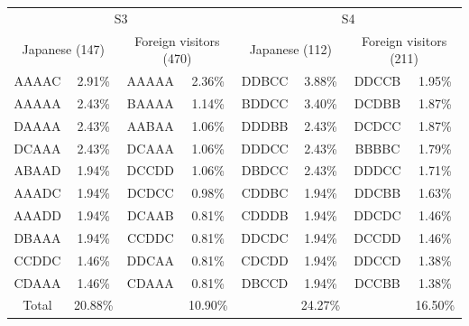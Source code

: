 \begin{table}[h]
\begin{tabular}{cc|cc|cc|cc}
\hline
\\
\hline
\multicolumn{4}{c|}{S3}                                                     & \multicolumn{4}{c}{S4}                                                     \\
\multicolumn{2}{c}{Japanese (147)}  & \multicolumn{2}{c|}{Foreign visitors (470)} & \multicolumn{2}{c}{Japanese (112)}  & \multicolumn{2}{c}{Foreign visitors (211)} \\
\hline
AAAAC & 2.91\%                      & AAAAA  & 2.36\%                      & DDBCC & 3.88\%                      & DDCCB  & 1.95\%                      \\
AAAAA & 2.43\%                      & BAAAA  & 1.14\%                      & BDDCC & 3.40\%                      & DCDBB  & 1.87\%                      \\
DAAAA & 2.43\%                      & AABAA  & 1.06\%                      & DDDBB & 2.43\%                      & DCDCC  & 1.87\%                      \\
DCAAA & 2.43\%                      & DCAAA  & 1.06\%                      & DDDCC & 2.43\%                      & BBBBC  & 1.79\%                      \\
ABAAD & 1.94\%                      & DCCDD  & 1.06\%                      & DBDCC & 2.43\%                      & DDDCC  & 1.71\%                      \\
AAADC & 1.94\%                      & DCDCC  & 0.98\%                      & CDDBC & 1.94\%                      & DDCBB  & 1.63\%                      \\
AAADD & 1.94\%                      & DCAAB  & 0.81\%                      & CDDDB & 1.94\%                      & DDCDC  & 1.46\%                      \\
DBAAA & 1.94\%                      & CCDDC  & 0.81\%                      & DDCDC & 1.94\%                      & DCCDD  & 1.46\%                      \\
CCDDC & 1.46\%                      & DDCAA  & 0.81\%                      & CDCDD & 1.94\%                      & DDCCD  & 1.38\%                      \\
CDAAA & 1.46\%                      & CDAAA  & 0.81\%                      & DBCCD & 1.94\%                      & DCCBB  & 1.38\%                      \\
\hline
Total & \multicolumn{1}{c}{20.88\%} &        & \multicolumn{1}{c|}{10.90\%} &       & \multicolumn{1}{c}{24.27\%} &        & \multicolumn{1}{c}{16.50\%} \\
\hline
\end{tabular}
\end{table}















